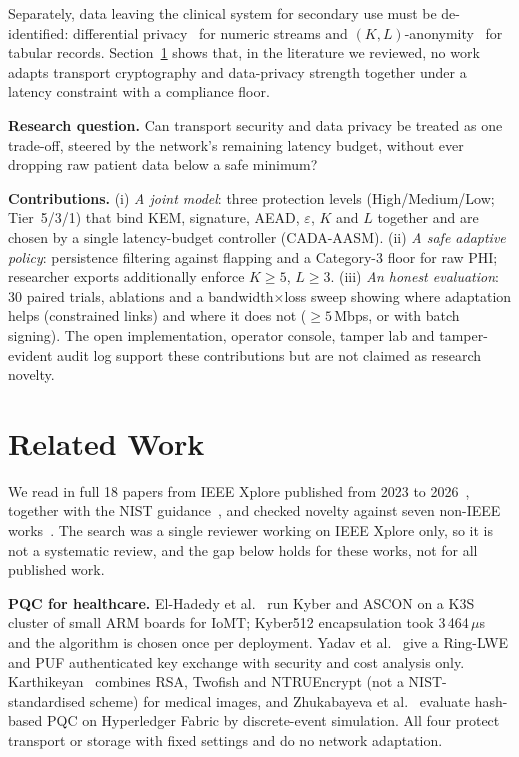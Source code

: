 \documentclass[10pt,twocolumn]{article}
\begin{document}
Separately, data leaving the clinical system for secondary use must be de-identified: differential privacy~\cite{dwork} for numeric streams and $(K,L)$-anonymity~\cite{sweeney,ldiv} for tabular records. Section~\ref{sec:related} shows that, in the literature we reviewed, no work adapts transport cryptography and data-privacy strength together under a latency constraint with a compliance floor.

\textbf{Research question.} Can transport security and data privacy be treated as one trade-off, steered by the network's remaining latency budget, without ever dropping raw patient data below a safe minimum?

\textbf{Contributions.} (i) \emph{A joint model}: three protection levels (High/Medium/Low; Tier~5/3/1) that bind KEM, signature, AEAD, $\varepsilon$, $K$ and $L$ together and are chosen by a single latency-budget controller (CADA-AASM). (ii) \emph{A safe adaptive policy}: persistence filtering against flapping and a Category-3 floor for raw PHI; researcher exports additionally enforce $K\ge5$, $L\ge3$. (iii) \emph{An honest evaluation}: 30 paired trials, ablations and a bandwidth$\times$loss sweep showing where adaptation helps (constrained links) and where it does not ($\ge5$\,Mbps, or with batch signing). The open implementation, operator console, tamper lab and tamper-evident audit log support these contributions but are not claimed as research novelty.

\section{Related Work}\label{sec:related}
We read in full 18 papers from IEEE Xplore published from 2023 to 2026~\cite{ieee04_elhadedy2024,ieee05_yadav2023,ieee06_sinaga2025,ieee07_santos2026,ieee08_karthikeyan2023,ieee09_zhukabayeva2024,ieee10_aydeger2026,ieee11_ojetunde2025,ieee12_lokesh2025,ieee13_rubiogarcia2023,ieee14_catoni2025,ieee15_rigon2025,ieee16_reazaei2026,ieee17_he2024,ieee18_yu2024,ieee19_zhang2023,ieee20_lyu2025,ieee21_birajdar2025}, together with the NIST guidance~\cite{cswp39}, and checked novelty against seven non-IEEE works~\cite{alif,kampanakis,qpradax,adaptiveqke,caap,alpine,zaman}. The search was a single reviewer working on IEEE Xplore only, so it is not a systematic review, and the gap below holds for these works, not for all published work.

\textbf{PQC for healthcare.} El-Hadedy et al.~\cite{ieee04_elhadedy2024} run Kyber and ASCON on a K3S cluster of small ARM boards for IoMT; Kyber512 encapsulation took 3\,464\,$\mu$s and the algorithm is chosen once per deployment. Yadav et al.~\cite{ieee05_yadav2023} give a Ring-LWE and PUF authenticated key exchange with security and cost analysis only. Karthikeyan~\cite{ieee08_karthikeyan2023} combines RSA, Twofish and NTRUEncrypt (not a NIST-standardised scheme) for medical images, and Zhukabayeva et al.~\cite{ieee09_zhukabayeva2024} evaluate hash-based PQC on Hyperledger Fabric by discrete-event simulation. All four protect transport or storage with fixed settings and do no network adaptation.
\end{document}
